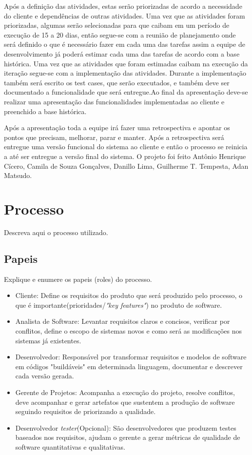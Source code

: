 \documentclass[	DIV=calc,%
							paper=a4,%
							fontsize=12pt,%
							onecolumn]{scrartcl}	 					%
\begin{document}
 Após a definição das atividades, estas serão priorizadas de acordo a necessidade do cliente e dependências de outras atividades. Uma vez que as atividades foram priorizadas, algumas serão selecionadas para que caibam em um período de execução de 15 a 20 dias, então segue-se com a reunião de planejamento onde será definido o que é necessário fazer em cada uma das tarefas assim a equipe de desenvolvimento já poderá estimar cada uma das tarefas de acordo com a base histórica. Uma vez que as atividades que foram estimadas caibam na execução da iteração segue-se com a implementação das atividades. Durante a implementação também será escrito os test cases, que serão executados, e também deve ser documentado a funcionalidade que será entregue.Ao final da apresentação deve-se realizar uma apresentação das funcionalidades implementadas ao cliente e preenchido a base histórica. 
 
 Após a apresentação toda a equipe irá fazer uma retrospectiva e apontar os pontos que precisam, melhorar, parar e manter. Após a retrospectiva será entregue uma versão funcional do sistema ao cliente e então o processo se reinicia a até ser entregue a versão final do sistema. O projeto foi feito Antônio Henrique Cícero, Camila de Souza Gonçalves, Danillo Lima, Guilherme T. Tempesta, Adan Matsudo.
 
\section{Processo}
Descreva aqui o processo utilizado.

\subsection{Papeis}
Explique e enumere os papeis (roles) do processo.

\begin{itemize}
	\item Cliente: Define os requisitos do produto que será produzido pelo processo, o que é importante(prioridades/\textit{"key features"}) no produto de software.
	\item Analista de Software: Levantar requisitos claros e concisos, verificar por conflitos, define o  escopo de sistemas novos e como será as modificações nos sistemas já existentes.
	\item Desenvolvedor: Responsável por transformar requisitos e modelos de software em códigos "buildáveis" em determinada linguagem, documentar e descrever cada versão gerada.
	\item Gerente de Projetos: Acompanha a execução do projeto, resolve conflitos, deve acompanhar e gerar artefatos que sustentem a produção de software seguindo requisitos de priorizando a qualidade.
	\item Desenvolvedor \textit{tester}(Opcional): São desenvolvedores que produzem testes baseados nos requisitos, ajudam o gerente a gerar métricas de qualidade de software quantitativas e qualitativas.   
\end{itemize}
\end{document}
